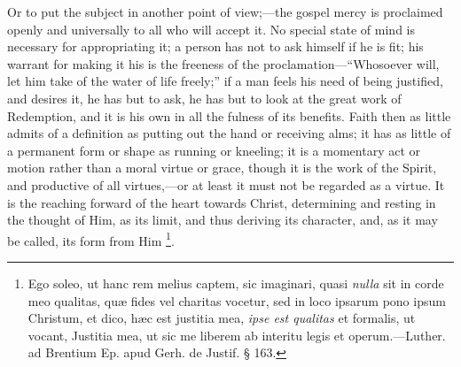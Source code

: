 Or to put the subject in another point of view;—the gospel mercy
is proclaimed openly and universally to all who will accept it. No
special state of mind is necessary for appropriating it; a person has
not to ask himself if he is fit; his warrant for making it his is the
freeness of the proclamation—``Whosoever will, let him take of
the water of life freely;'' if a man feels his need of being
justified, and desires it, he has but to ask, he has but to look at
the great work of Redemption, and it is his own in all the fulness of
its benefits. Faith then as little admits of a definition as putting
out the hand or receiving alms; it has as little of a permanent form
or shape as running or kneeling; it is a momentary act or motion
rather than a moral virtue or grace, though it is the work of the
Spirit, and productive of all virtues,—or at least it must not be
regarded as a virtue. It is the reaching forward of the heart towards
Christ, determining and resting in the thought of Him, as its limit,
and thus deriving its character, and, as it may be called, its form
from Him \footnote{Ego soleo, ut
hanc rem melius captem, sic imaginari, quasi \emph{nulla} sit in corde
meo qualitas, quæ fides vel charitas vocetur, sed in loco ipsarum
pono ipsum Christum, et dico, hæc est justitia mea, \emph{ipse est
qualitas} et formalis, ut vocant, Justitia mea, ut sic me liberem
ab interitu legis et operum.—Luther. ad Brentium Ep. apud Gerh. de
Justif. § 163.}.

